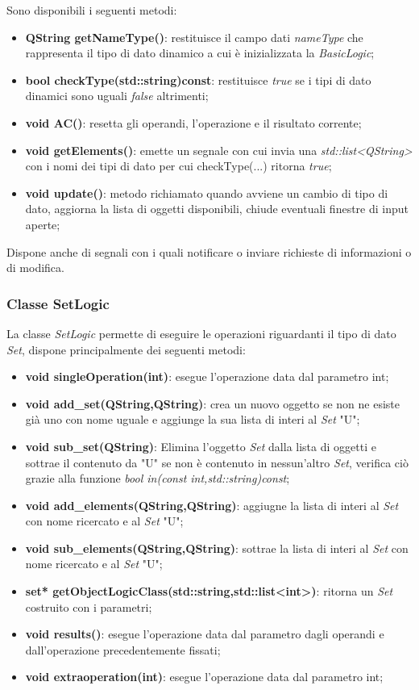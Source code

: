 \documentclass[a4paper,10pt]{article}
\begin{document}
        Sono disponibili i seguenti metodi:
        \begin{itemize}
            \item \textbf{QString getNameType()}: restituisce il campo dati \textit{nameType} che rappresenta il tipo di dato dinamico a cui è inizializzata la \textit{BasicLogic};
            \item \textbf{bool checkType(std::string)const}: restituisce \textit{true} se i tipi di dato dinamici sono uguali \textit{false} altrimenti;
            \item \textbf{void AC()}: resetta gli operandi, l'operazione e il risultato corrente;
            \item \textbf{void getElements()}: emette un segnale con cui invia una \textit{std::list<QString>} con i nomi dei tipi di dato per cui checkType(...) ritorna \textit{true};
            \item \textbf{void update()}: metodo richiamato quando avviene un cambio di tipo di dato, aggiorna la lista di oggetti disponibili, chiude eventuali finestre di input aperte;
        \end{itemize}
        Dispone anche di segnali con i quali notificare o inviare richieste di informazioni o di modifica.

        \subsubsection{Classe SetLogic}
        La classe \textit{SetLogic} permette di eseguire le operazioni riguardanti il tipo di dato \textit{Set}, dispone principalmente dei seguenti metodi:
        \begin{itemize}
            \item \textbf{void singleOperation(int)}: esegue l'operazione data dal parametro int;
            \item \textbf{void add\_set(QString,QString)}: crea un nuovo oggetto se non ne esiste già uno con nome uguale e aggiunge la sua lista di interi al \textit{Set} "U";
            \item \textbf{void sub\_set(QString)}: Elimina l'oggetto \textit{Set} dalla lista di oggetti e sottrae il contenuto da "U" se non è contenuto in nessun'altro \textit{Set}, verifica ciò grazie alla funzione \textit{bool in(const int,std::string)const};
            \item \textbf{void add\_elements(QString,QString)}: aggiugne la lista di interi al \textit{Set} con nome ricercato e al \textit{Set} "U";
            \item \textbf{void sub\_elements(QString,QString)}: sottrae la lista di interi al \textit{Set} con nome ricercato e al \textit{Set} "U";
            \item \textbf{set* getObjectLogicClass(std::string,std::list<int>)}: ritorna un \textit{Set} costruito con i parametri;
            \item \textbf{void results()}: esegue l'operazione data dal parametro dagli operandi e dall'operazione precedentemente fissati;
            \item \textbf{void extraoperation(int)}: esegue l'operazione data dal parametro int;
        \end{itemize}
\end{document}
